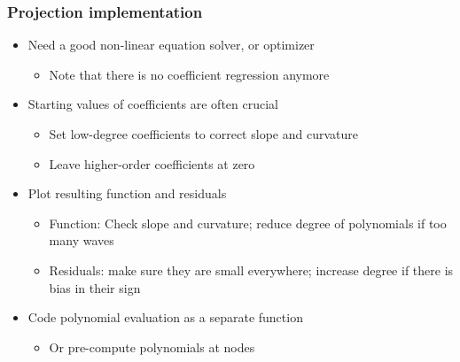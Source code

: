 \documentclass[bigger,handout]{beamer}
\begin{document}
\begin{frame}%
  
\frametitle{Projection implementation}

\begin{itemize}
\item Need a good non-linear equation solver, or optimizer

\begin{itemize}
\item Note that there is no coefficient regression anymore
\end{itemize}

\item Starting values of coefficients are often crucial

\begin{itemize}
\item Set low-degree coefficients to correct slope and curvature

\item Leave higher-order coefficients at zero
\end{itemize}

\item Plot resulting function and residuals

\begin{itemize}
\item Function: Check slope and curvature; \newline
reduce degree of polynomials if too many waves

\item Residuals: make sure they are small everywhere; \newline
increase degree if there is bias in their sign
\end{itemize}

\item Code polynomial evaluation as a separate function

\begin{itemize}
\item Or pre-compute polynomials at nodes
\end{itemize}
\end{itemize}

  
 
\end{frame}%
\end{document}
